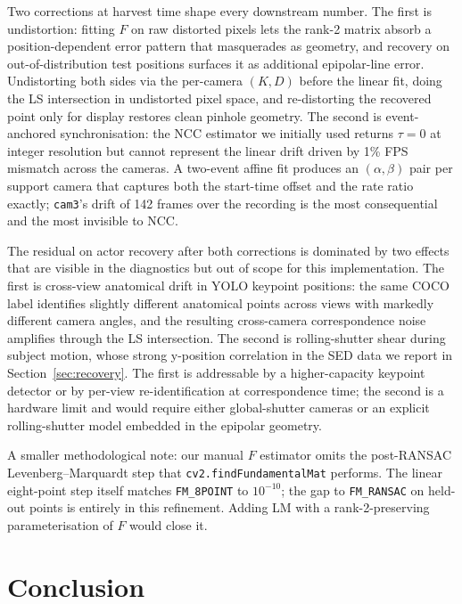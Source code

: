 \documentclass[twocolumn]{article}
\newcommand{\cam}[1]{\texttt{cam#1}}
\begin{document}
Two corrections at harvest time shape every downstream number. The
first is undistortion: fitting $F$ on raw distorted pixels lets
the rank-2 matrix absorb a position-dependent error pattern that
masquerades as geometry, and recovery on out-of-distribution test
positions surfaces it as additional epipolar-line error. Undistorting
both sides via the per-camera $(K, D)$ before the linear fit, doing
the LS intersection in undistorted pixel space, and re-distorting
the recovered point only for display restores clean pinhole
geometry. The second is event-anchored synchronisation: the NCC
estimator we initially used returns $\tau = 0$ at integer
resolution but cannot represent the linear drift driven by 1\% FPS
mismatch across the cameras. A two-event affine fit produces an
$(\alpha, \beta)$ pair per support camera that captures both the
start-time offset and the rate ratio exactly; \cam{3}'s drift of 142
frames over the recording is the most consequential and the most
invisible to NCC.

The residual on actor recovery after both corrections is dominated
by two effects that are visible in the \mbox{diagnostics} but out of scope
for this implementation. The first is cross-view anatomical drift
in YOLO keypoint positions: the same COCO label identifies slightly
different anatomical points across views with markedly different
camera angles, and the resulting cross-camera correspondence noise
amplifies through the LS intersection. The second is rolling-shutter
shear during subject motion, whose strong y-position correlation in
the SED data we report in Section~\ref{sec:recovery}. The first is
addressable by a higher-capacity keypoint detector or by per-view
re-identification at correspondence time; the second is a hardware
limit and would require either global-shutter cameras or an explicit
rolling-shutter model embedded in the epipolar geometry.

A smaller methodological note: our manual $F$ estimator omits the
post-RANSAC Levenberg--Marquardt step that
\texttt{cv2.findFundamentalMat} performs. The linear eight-point
step itself matches \texttt{FM\_8POINT} to $10^{-10}$; the gap to
\texttt{FM\_RANSAC} on held-out points is entirely in this
refinement. Adding LM with a rank-2-preserving parameterisation of
$F$ would close it.

\section{Conclusion}
\label{sec:conclusion}
\end{document}
